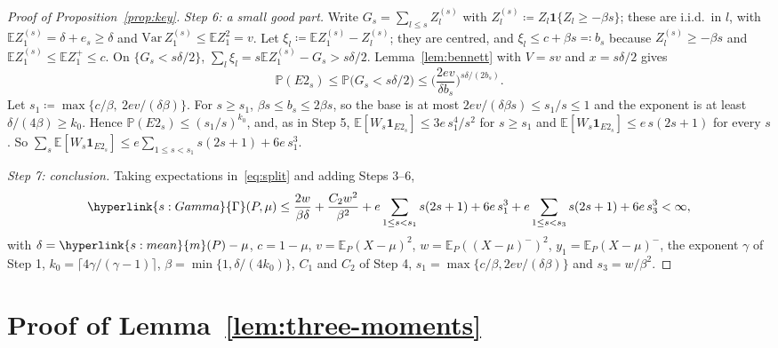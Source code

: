 \documentclass[11pt]{article}
\newcommand{\E}{\mathbb{E}}
\newcommand{\Prob}{\mathbb{P}}
\newcommand{\ind}{\mathbf{1}}
\newcommand{\sy}[2]{{\hyperlink{#1}{#2}}}
\newcommand{\mean}{\sy{s:mean}{m}}
\newcommand{\Gam}{\sy{s:Gamma}{\Gamma}}
\begin{document}
\begin{proof}[Proof of Proposition~\ref{prop:key}]
\emph{Step 6: a small good part.} Write $G_s=\sum_{l\le s}Z_l^{(s)}$ with
$Z_l^{(s)}\coloneqq Z_l\ind\{Z_l\ge-\beta s\}$; these are i.i.d.\ in $l$, with
$\E Z_1^{(s)}=\delta+e_s\ge\delta$ and $\mathrm{Var}\,Z_1^{(s)}\le\E Z_1^2=v$. Let
$\xi_l\coloneqq\E Z_1^{(s)}-Z_l^{(s)}$; they are centred, and $\xi_l\le c+\beta s\eqqcolon b_s$
because $Z_l^{(s)}\ge-\beta s$ and $\E Z_1^{(s)}\le\E Z_1^+\le c$. On $\{G_s<s\delta/2\}$,
$\sum_l\xi_l=s\E Z_1^{(s)}-G_s>s\delta/2$. Lemma~\ref{lem:bennett} with $V=sv$ and $x=s\delta/2$ gives
\[
  \Prob(E2_s)\le\Prob\big(G_s<s\delta/2\big)\le\Big(\frac{2ev}{\delta b_s}\Big)^{s\delta/(2b_s)}.
\]
Let $s_1\coloneqq\max\{c/\beta,\ 2ev/(\delta\beta)\}$. For $s\ge s_1$, $\beta s\le b_s\le2\beta s$, so the
base is at most $2ev/(\delta\beta s)\le s_1/s\le1$ and the exponent is at least
$\delta/(4\beta)\ge k_0$. Hence $\Prob(E2_s)\le(s_1/s)^{k_0}$, and, as in Step 5,
$\E[W_s\ind_{E2_s}]\le3e\,s_1^4/s^2$ for $s\ge s_1$ and $\E[W_s\ind_{E2_s}]\le e\,s(2s+1)$ for every
$s$. So $\sum_s\E[W_s\ind_{E2_s}]\le e\sum_{1\le s<s_1}s(2s+1)+6e\,s_1^3$.

\emph{Step 7: conclusion.} Taking expectations in~\eqref{eq:split} and adding Steps 3--6,
\begin{equation}\label{eq:gammabound}
  \Gam(P,\mu)\le\frac{2w}{\beta\delta}+\frac{C_2w^2}{\beta^2}+e\sum_{1\le s<s_1}s(2s+1)+6e\,s_1^3
  +e\sum_{1\le s<s_3}s(2s+1)+6e\,s_3^3<\infty,
\end{equation}
with $\delta=\mean(P)-\mu$, $c=1-\mu$, $v=\E_P(X-\mu)^2$, $w=\E_P((X-\mu)^-)^2$, $y_1=\E_P(X-\mu)^-$, the
exponent $\gamma$ of Step 1, $k_0=\lceil4\gamma/(\gamma-1)\rceil$, $\beta=\min\{1,\delta/(4k_0)\}$,
$C_1$ and $C_2$ of Step 4, $s_1=\max\{c/\beta,2ev/(\delta\beta)\}$ and $s_3=w/\beta^2$.
\end{proof}

\section{Proof of Lemma~\ref{lem:three-moments}}\label{sec:proof-three}
\end{document}
